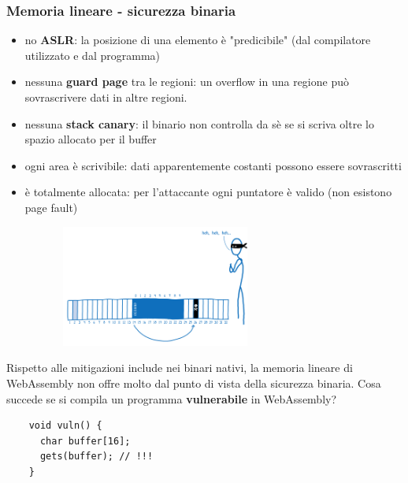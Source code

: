 \documentclass{beamer}
\begin{document}
\begin{frame}
  \frametitle{Memoria lineare - sicurezza binaria}
  \begin{itemize}
    \item no \textbf{ASLR}: la posizione di una elemento è "predicibile" (dal
      compilatore utilizzato e dal programma)
    \item nessuna \textbf{guard page} tra le regioni: un overflow in una regione può sovrascrivere dati in
      altre regioni.
    \item nessuna \textbf{stack canary}: il binario non controlla da sè se si scriva
      oltre lo spazio
      allocato per il buffer
    \item ogni area è scrivibile: dati apparentemente costanti possono essere
      sovrascritti
    \item è totalmente allocata: per l'attaccante ogni puntatore è valido (non
      esistono page fault)
  \end{itemize}

  \centerline{\includegraphics[width=10cm,height=4cm,keepaspectratio]{images/attack.png}}
\end{frame}

\begin{frame}[fragile]
  Rispetto alle mitigazioni include nei binari nativi, la memoria lineare di
  WebAssembly non offre molto dal punto di vista della sicurezza binaria.
\newline\newline
  Cosa succede se si compila un programma \textbf{vulnerabile} in WebAssembly?
\newline\newline
  \begin{verbatim}
    void vuln() {
      char buffer[16];
      gets(buffer); // !!!
    }
  \end{verbatim}
\end{frame}
\end{document}
